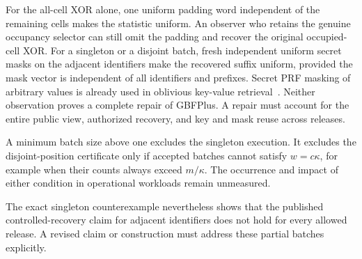 For the all-cell XOR alone, one uniform padding word independent of the remaining
cells makes the statistic uniform. An observer who retains the genuine occupancy selector
can still omit the padding and recover the original occupied-cell XOR.
For a singleton or a disjoint batch, fresh independent uniform secret masks on the
adjacent identifiers make the recovered suffix uniform, provided the mask vector
is independent of all identifiers and prefixes. Secret PRF
masking of arbitrary values is already used in oblivious key-value
retrieval~\cite{hao2024okvr}. Neither observation proves
a complete repair of GBFPlus. A repair must account for the entire public view,
authorized recovery, and key and mask reuse across releases.

A minimum batch size above one excludes the singleton execution. It excludes
the disjoint-position certificate only if accepted batches cannot satisfy
$w=c\kappa$, for example when their counts always exceed $m/\kappa$.
The occurrence and impact of either condition in operational workloads remain
unmeasured.

The exact singleton counterexample nevertheless shows that the
published controlled-recovery claim for adjacent identifiers does not hold
for every allowed release. A revised claim or construction must address these
partial batches explicitly.
